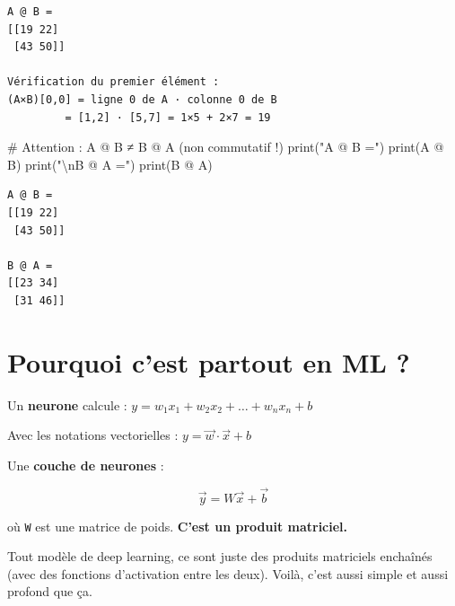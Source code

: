\documentclass[
  french,
  11pt,
  a4paper,
]{scrbook}
\newenvironment{Shaded}{}{}
\newcommand{\BuiltInTok}[1]{\textcolor[rgb]{0.84,0.23,0.29}{#1}}
\newcommand{\CharTok}[1]{\textcolor[rgb]{0.01,0.18,0.38}{#1}}
\newcommand{\CommentTok}[1]{\textcolor[rgb]{0.42,0.45,0.49}{#1}}
\newcommand{\NormalTok}[1]{\textcolor[rgb]{0.14,0.16,0.18}{#1}}
\newcommand{\OperatorTok}[1]{\textcolor[rgb]{0.14,0.16,0.18}{#1}}
\newcommand{\StringTok}[1]{\textcolor[rgb]{0.01,0.18,0.38}{#1}}
\begin{document}
\begin{verbatim}
A @ B =
[[19 22]
 [43 50]]

Vérification du premier élément :
(A×B)[0,0] = ligne 0 de A · colonne 0 de B
         = [1,2] · [5,7] = 1×5 + 2×7 = 19
\end{verbatim}

\begin{Shaded}
\begin{Highlighting}[]
\CommentTok{\# Attention : A @ B ≠ B @ A (non commutatif !)}
\BuiltInTok{print}\NormalTok{(}\StringTok{"A @ B ="}\NormalTok{)}
\BuiltInTok{print}\NormalTok{(A }\OperatorTok{@}\NormalTok{ B)}
\BuiltInTok{print}\NormalTok{(}\StringTok{"}\CharTok{\textbackslash{}n}\StringTok{B @ A ="}\NormalTok{)}
\BuiltInTok{print}\NormalTok{(B }\OperatorTok{@}\NormalTok{ A)}
\end{Highlighting}
\end{Shaded}

\begin{verbatim}
A @ B =
[[19 22]
 [43 50]]

B @ A =
[[23 34]
 [31 46]]
\end{verbatim}

\section{Pourquoi c'est partout en ML
?}\label{pourquoi-cest-partout-en-ml}

Un \textbf{neurone} calcule :
\(y = w_1 x_1 + w_2 x_2 + \dots + w_n x_n + b\)

Avec les notations vectorielles : \(y = \vec{w} \cdot \vec{x} + b\)

Une \textbf{couche de neurones} :

\[\vec{y} = W \vec{x} + \vec{b}\]

où \texttt{W} est une matrice de poids. \textbf{C'est un produit
matriciel.}

\begin{tcolorbox}[enhanced jigsaw, arc=.35mm, bottomrule=.15mm, bottomtitle=1mm, breakable, colback=white, colbacktitle=quarto-callout-tip-color!10!white, colframe=quarto-callout-tip-color-frame, coltitle=black, left=2mm, leftrule=.75mm, opacityback=0, opacitybacktitle=0.6, rightrule=.15mm, title=\textcolor{quarto-callout-tip-color}{\faLightbulb}\hspace{0.5em}{Astuce}, titlerule=0mm, toprule=.15mm, toptitle=1mm]

Tout modèle de deep learning, ce sont juste des produits matriciels
enchaînés (avec des fonctions d'activation entre les deux). Voilà, c'est
aussi simple et aussi profond que ça.

\end{tcolorbox}
\end{document}
